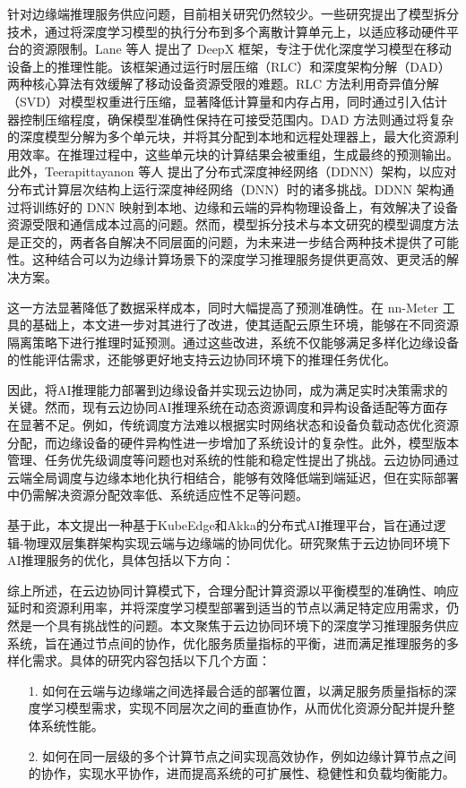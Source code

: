 针对边缘端推理服务供应问题，目前相关研究仍然较少。一些研究提出了模型拆分技术，通过将深度学习模型的执行分布到多个离散计算单元上，以适应移动硬件平台的资源限制。Lane 等人\cite{lane2016deepx} 提出了 DeepX 框架，专注于优化深度学习模型在移动设备上的推理性能。该框架通过运行时层压缩（RLC）和深度架构分解（DAD）两种核心算法有效缓解了移动设备资源受限的难题。RLC 方法利用奇异值分解（SVD）对模型权重进行压缩，显著降低计算量和内存占用，同时通过引入估计器控制压缩程度，确保模型准确性保持在可接受范围内。DAD 方法则通过将复杂的深度模型分解为多个单元块，并将其分配到本地和远程处理器上，最大化资源利用效率。在推理过程中，这些单元块的计算结果会被重组，生成最终的预测输出。此外，Teerapittayanon 等人\cite{teerapittayanon2017distributed} 提出了分布式深度神经网络（DDNN）架构，以应对分布式计算层次结构上运行深度神经网络（DNN）时的诸多挑战。DDNN 架构通过将训练好的 DNN 映射到本地、边缘和云端的异构物理设备上，有效解决了设备资源受限和通信成本过高的问题。然而，模型拆分技术与本文研究的模型调度方法是正交的，两者各自解决不同层面的问题，为未来进一步结合两种技术提供了可能性。这种结合可以为边缘计算场景下的深度学习推理服务提供更高效、更灵活的解决方案。

这一方法显著降低了数据采样成本，同时大幅提高了预测准确性。在 nn-Meter 工具的基础上，本文进一步对其进行了改进，使其适配云原生环境，能够在不同资源隔离策略下进行推理时延预测。通过这些改进，系统不仅能够满足多样化边缘设备的性能评估需求，还能够更好地支持云边协同环境下的推理任务优化。

因此，将AI推理能力部署到边缘设备并实现云边协同，成为满足实时决策需求的关键。然而，现有云边协同AI推理系统在动态资源调度和异构设备适配等方面存在显著不足。例如，传统调度方法难以根据实时网络状态和设备负载动态优化资源分配，而边缘设备的硬件异构性进一步增加了系统设计的复杂性。此外，模型版本管理、任务优先级调度等问题也对系统的性能和稳定性提出了挑战。云边协同通过云端全局调度与边缘本地化执行相结合，能够有效降低端到端延迟，但在实际部署中仍需解决资源分配效率低、系统适应性不足等问题。

基于此，本文提出一种基于KubeEdge和Akka的分布式AI推理平台，旨在通过逻辑-物理双层集群架构实现云端与边缘端的协同优化。研究聚焦于云边协同环境下AI推理服务的优化，具体包括以下方向：

综上所述，在云边协同计算模式下，合理分配计算资源以平衡模型的准确性、响应延时和资源利用率，并将深度学习模型部署到适当的节点以满足特定应用需求，仍然是一个具有挑战性的问题。本文聚焦于云边协同环境下的深度学习推理服务供应系统，旨在通过节点间的协作，优化服务质量指标的平衡，进而满足推理服务的多样化需求。具体的研究内容包括以下几个方面：

\begin{enumerate}
\item[1.] 如何在云端与边缘端之间选择最合适的部署位置，以满足服务质量指标的深度学习模型需求，实现不同层次之间的垂直协作，从而优化资源分配并提升整体系统性能。
\item[2.] 如何在同一层级的多个计算节点之间实现高效协作，例如边缘计算节点之间的协作，实现水平协作，进而提高系统的可扩展性、稳健性和负载均衡能力。
\end{enumerate}


